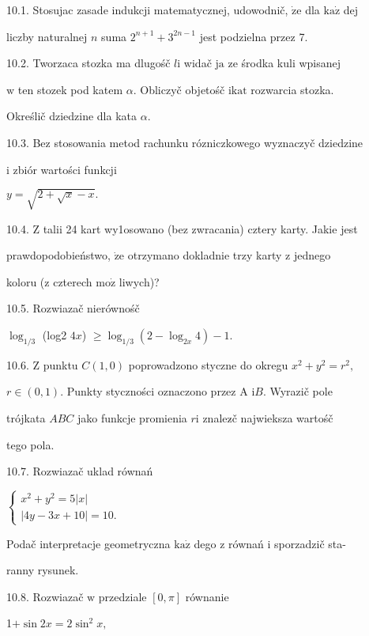 \documentclass[a4paper,12pt]{article}
\begin{document}
10.1. Stosujac zasade indukcji matematycznej, udowodnič, $\dot{\mathrm{z}}\mathrm{e}$ dla $\mathrm{k}\mathrm{a}\dot{\mathrm{z}}$ dej

liczby naturalnej $n$ suma $2^{n+1}+3^{2n-1}$ jest podzielna przez 7.

10.2. Tworzaca stozka ma dlugośč $l \mathrm{i}$ widač $\mathrm{j}\mathrm{a}$ ze środka kuli wpisanej

$\mathrm{w}$ ten stozek pod katem $\alpha$. Obliczyč objetośč $\mathrm{i}\mathrm{k}\mathrm{a}\mathrm{t}$ rozwarcia stozka.

Określič dziedzine dla kata $\alpha.$

10.3. Bez stosowania metod rachunku rózniczkowego wyznaczyč dziedzine

$\mathrm{i}$ zbiór wartości funkcji

$y=\sqrt{2+\sqrt{x}-x}.$

10.4. $\mathrm{Z}$ talii 24 kart wy1osowano (bez zwracania) cztery karty. Jakie jest

prawdopodobieństwo, $\dot{\mathrm{z}}\mathrm{e}$ otrzymano dokladnie trzy karty $\mathrm{z}$ jednego

koloru ($\mathrm{z}$ czterech $\mathrm{m}\mathrm{o}\dot{\mathrm{z}}$ liwych)?

10.5. Rozwiazač nierównośč

$\log_{1/3}$ (log2 $4x$) $\geq\log_{1/3}(2-\log_{2x}4)-1.$

10.6. $\mathrm{Z}$ punktu $C(1,0)$ poprowadzono styczne do okregu $x^{2}+y^{2} = r^{2},$

$ r\in (0,1)$. Punkty styczności oznaczono przez A $\mathrm{i}B$. Wyrazič pole

trójkata $ABC$ jako funkcje promienia $r\mathrm{i}$ znalez$\acute{}$č najwieksza wartośč

tego pola.

10.7. Rozwiazač uklad równań

$\left\{\begin{array}{l}
x^{2}+y^{2}=5|x|\\
|4y-3x+10|=10.
\end{array}\right.$

Podač interpretacje geometryczna $\mathrm{k}\mathrm{a}\dot{\mathrm{z}}$ dego $\mathrm{z}$ równań $\mathrm{i}$ sporzadzič sta-

ranny rysunek.

10.8. Rozwiazač $\mathrm{w}$ przedziale $[0,\pi]$ równanie

1$+ \sin 2x=2\sin^{2}x,$
\end{document}
